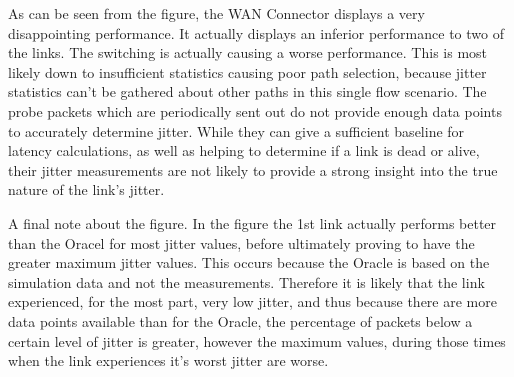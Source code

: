 As can be seen from the figure, the WAN Connector displays a very disappointing performance. It actually displays an inferior performance to two of the links. The switching is actually causing a worse performance. This is most likely down to insufficient statistics causing poor path selection, because jitter statistics can't be gathered about other paths in this single flow scenario. The probe packets which are periodically sent out do not provide enough data points to accurately determine jitter. While they can give a sufficient baseline for latency calculations, as well as helping to determine if a link is dead or alive, their jitter measurements are not likely to provide a strong insight into the true nature of the link's jitter.

A final note about the figure. In the figure the 1st link actually performs better than the Oracel for most jitter values, before ultimately proving to have the greater maximum jitter values. This occurs because the Oracle is based on the simulation data and not the measurements. Therefore it is likely that the link experienced, for the most part, very low jitter, and thus because there are more data points available than for the Oracle, the percentage of packets below a certain level of jitter is greater, however the maximum values, during those times when the link experiences it's worst jitter are worse.































